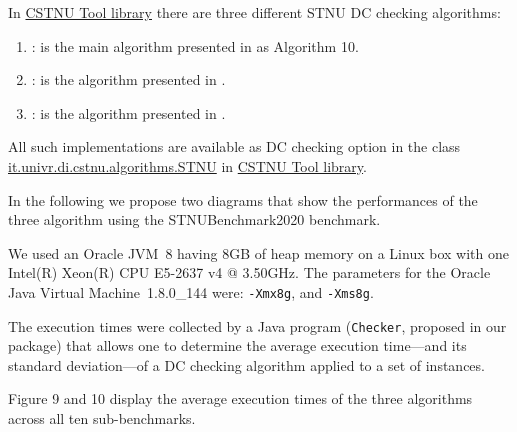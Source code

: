 \documentclass[a4paper,11pt]{article}
\begin{document}
In \href{http://profs.scienze.univr.it/~posenato/software/cstnu/}{CSTNU Tool library} there are three different STNU DC checking algorithms:
\begin{enumerate}
	\item \textbf{\rulTwenty}: is the main algorithm presented in \cite{HunsbergerPTR21} as Algorithm 10.
	\item \textbf{\RULminus}: is the algorithm presented in \cite{CairoHR18}.
	\item \textbf{\morrisFourteen}: is the algorithm presented in \cite{Morris14}.
\end{enumerate}
All such implementations are available as DC checking option in the class
\href{http://profs.scienze.univr.it/~posenato/software/cstnu/apidocs/it/univr/di/cstnu/algorithms/STNU.html}{it.univr.di.cstnu.algorithms.STNU} in \href{http://profs.scienze.univr.it/~posenato/software/cstnu/}{CSTNU Tool library}.

In the following we propose two diagrams that show the performances of the three algorithm using the STNUBenchmark2020 benchmark.

We used an Oracle JVM~8 having 8GB of heap memory on a Linux box with one Intel(R) Xeon(R) CPU E5-2637 v4 @ 3.50GHz.
The parameters for the Oracle Java Virtual Machine~1.8.0\_144 were: \texttt{-Xmx8g}, and \texttt{-Xms8g}.

The execution times were collected by a Java program (\texttt{Checker}, proposed in our package) that allows one to determine the average execution time---and its standard deviation---of a DC checking algorithm applied to a set of instances.



Figure 9 and 10 display the average execution times of the three algorithms across all ten sub-benchmarks.





\renewcommand{\yerrstd}{1.972*\thisrow{yerr}/(\thisrow{n}^.5)}%
\newcommand{\eerrstd}{1.972*\thisrow{eerr}/(\thisrow{n}^.5)}%
\newcommand{\cerrstd}{1.972*\thisrow{cerr}/(\thisrow{n}^.5)}%

\end{document}
